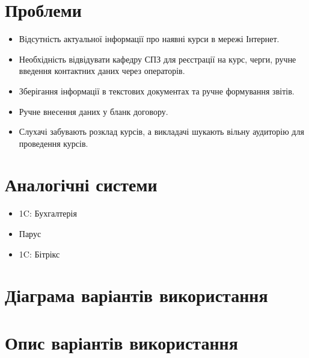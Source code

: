 \section*{Проблеми}

\begin{itemize}
 \item Відсутність актуальної інформації про наявні курси в мережі Інтернет.
 \item Необхідність відвідувати кафедру СПЗ для реєстрації на курс, черги, ручне введення контактних даних через операторів.
 \item Зберігання інформації в текстових документах та ручне формування звітів.
 \item Ручне внесення даних у бланк договору.
 \item Слухачі забувають розклад курсів, а викладачі шукають вільну аудиторію для проведення курсів.
\end{itemize}

\section*{Аналогічні системи}

\begin{itemize}
 \item 1C: Бухгалтерія
 \item Парус
 \item 1C: Бітрікс
\end{itemize}

\newpage

\section*{Діаграма варіантів використання}

\scalebox{0.4}{}

\section*{Опис варіантів використання}

